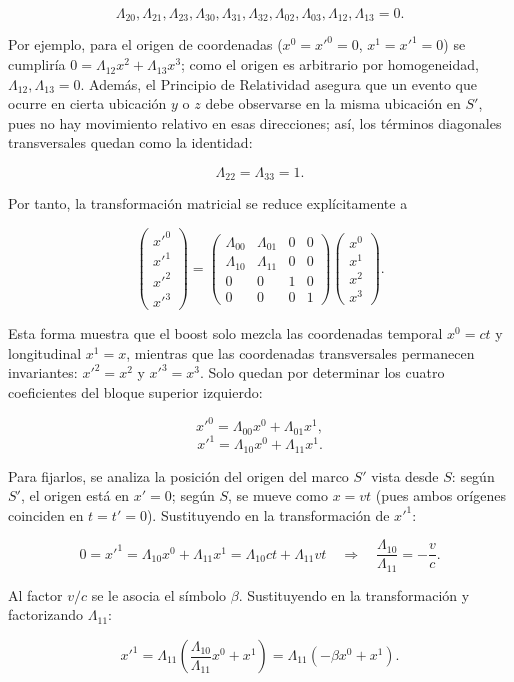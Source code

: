 $$\Lambda_{20}, \Lambda_{21}, \Lambda_{23}, \Lambda_{30}, \Lambda_{31}, \Lambda_{32}, \Lambda_{02}, \Lambda_{03}, \Lambda_{12}, \Lambda_{13} = 0.$$

Por ejemplo, para el origen de coordenadas ($x^0 = x'^0 = 0$, $x^1 = x'^1 = 0$) se cumpliría $0 = \Lambda_{12}x^2 + \Lambda_{13}x^3$; como el origen es arbitrario por homogeneidad, $\Lambda_{12}, \Lambda_{13} = 0$. Además, el Principio de Relatividad asegura que un evento que ocurre en cierta ubicación $y$ o $z$ debe observarse en la misma ubicación en $S'$, pues no hay movimiento relativo en esas direcciones; así, los términos diagonales transversales quedan como la identidad:

$$\Lambda_{22} = \Lambda_{33} = 1.$$

Por tanto, la transformación matricial se reduce explícitamente a

\[
\begin{pmatrix}
    x'^0 \\
    x'^1 \\
    x'^2 \\
    x'^3
\end{pmatrix}
=
\begin{pmatrix}
    \Lambda_{00} & \Lambda_{01} & 0 & 0 \\
    \Lambda_{10} & \Lambda_{11} & 0 & 0 \\
    0 & 0 & 1 & 0 \\
    0 & 0 & 0 & 1
\end{pmatrix}
\begin{pmatrix}
    x^0 \\
    x^1 \\
    x^2 \\
    x^3
\end{pmatrix}.
\]

Esta forma muestra que el boost solo mezcla las coordenadas temporal $x^0=ct$ y longitudinal $x^1=x$, mientras que las coordenadas transversales permanecen invariantes: $x'^2=x^2$ y $x'^3=x^3$. Solo quedan por determinar los cuatro coeficientes del bloque superior izquierdo:

$$x'^0 = \Lambda_{00}x^0 + \Lambda_{01}x^1,$$
$$x'^1 = \Lambda_{10}x^0 + \Lambda_{11}x^1.$$

Para fijarlos, se analiza la posición del origen del marco $S'$ vista desde $S$: según $S'$, el origen está en $x' = 0$; según $S$, se mueve como $x = vt$ (pues ambos orígenes coinciden en $t = t' = 0$). Sustituyendo en la transformación de $x'^1$:

$$0 = x'^1 = \Lambda_{10}x^0 + \Lambda_{11}x^1 = \Lambda_{10}ct + \Lambda_{11}vt \quad \Rightarrow \quad \frac{\Lambda_{10}}{\Lambda_{11}} = -\frac{v}{c}.$$

Al factor $v/c$ se le asocia el símbolo $\beta$. Sustituyendo en la transformación y factorizando $\Lambda_{11}$:

$$x'^1 = \Lambda_{11}\left(\frac{\Lambda_{10}}{\Lambda_{11}}x^0 + x^1\right) = \Lambda_{11}(-\beta x^0 + x^1).$$